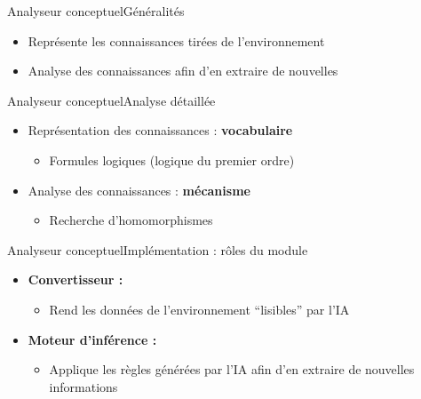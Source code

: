 \begin{frame}{Analyseur conceptuel}{Généralités}
\begin{itemize}
  \item Représente les connaissances tirées de l'environnement
  \item Analyse des connaissances afin d'en extraire de nouvelles
\end{itemize}
\end{frame}

\begin{frame}{Analyseur conceptuel}{Analyse détaillée}
\begin{itemize}
  \item Représentation des connaissances : \textbf{vocabulaire}
  \begin{itemize}
    \item Formules logiques (logique du premier ordre)
  \end{itemize}
  \pause
  \item Analyse des connaissances : \textbf{mécanisme}
  \begin{itemize}
    \item Recherche d'homomorphismes
  \end{itemize}
\end{itemize}
\end{frame}

\begin{frame}{Analyseur conceptuel}{Implémentation : rôles du module}
\begin{itemize}
  \item \textbf{Convertisseur :}
  \begin{itemize}
    \item Rend les données de l'environnement \enquote{lisibles} par l'IA
  \end{itemize}
  \item \textbf{Moteur d'inférence :}
  \begin{itemize}
    \item Applique les règles générées par l'IA afin d'en
    extraire de nouvelles informations
  \end{itemize}
\end{itemize}
\end{frame}

